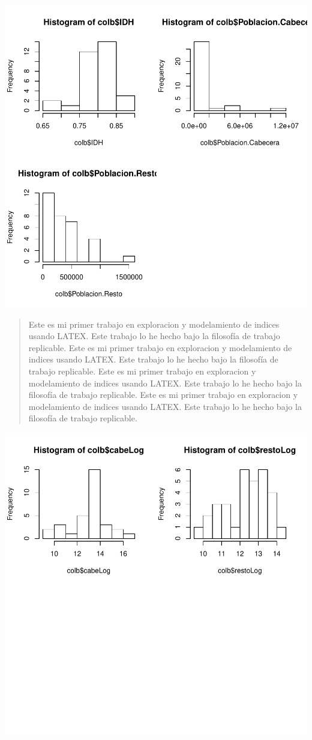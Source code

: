\documentclass{article}
\begin{document}
\centering
\includegraphics{ProyectoFINAL-barplots}



\begin{abstract}
Este es mi primer trabajo en exploracion y modelamiento de indices usando LATEX. Este trabajo lo he hecho bajo la filosofía de trabajo replicable. Este es mi primer trabajo en exploracion y modelamiento de indices usando LATEX. Este trabajo lo he hecho bajo la filosofía de trabajo replicable. Este es mi primer trabajo en exploracion y modelamiento de indices usando LATEX. Este trabajo lo he hecho bajo la filosofía de trabajo replicable. Este es mi primer trabajo en exploracion y modelamiento de indices usando LATEX. Este trabajo lo he hecho bajo la filosofía de trabajo replicable.
\end{abstract}

\centering
\includegraphics{ProyectoFINAL-barplots2}
\end{document}
